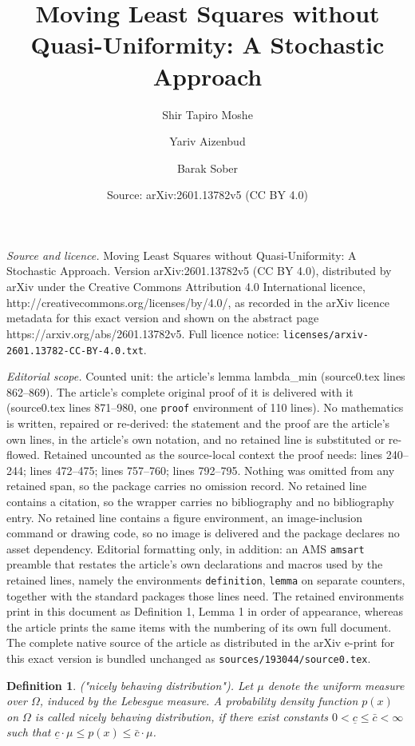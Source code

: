 \documentclass[10pt,a4paper]{amsart}
\title{Moving Least Squares without Quasi-Uniformity: A Stochastic Approach}
\author{Shir Tapiro Moshe \and Yariv Aizenbud \and Barak Sober}
\date{Source: arXiv:2601.13782v5 (CC BY 4.0)}
\newtheorem{definition}{Definition}
\begin{document}
\maketitle

\noindent\emph{Source and licence.} Moving Least Squares without Quasi-Uniformity: A Stochastic Approach. Version arXiv:2601.13782v5 (CC BY 4.0), distributed by arXiv under the Creative Commons Attribution 4.0 International licence, http://creativecommons.org/licenses/by/4.0/, as recorded in the arXiv licence metadata for this exact version and shown on the abstract page https://arxiv.org/abs/2601.13782v5. Full licence notice: \texttt{licenses/arxiv-2601.13782-CC-BY-4.0.txt}.\par\smallskip

\noindent\textit{Editorial scope.} Counted unit: the article's lemma lambda\_min (source0.tex lines 862--869). The article's complete original proof of it is delivered with it (source0.tex lines 871--980, one \texttt{proof} environment of 110 lines). No mathematics is written, repaired or re-derived: the statement and the proof are the article's own lines, in the article's own notation, and no retained line is substituted or re-flowed.  Retained uncounted as the source-local context the proof needs: lines 240--244; lines 472--475; lines 757--760; lines 792--795.  Nothing was omitted from any retained span, so the package carries no omission record.  No retained line contains a citation, so the wrapper carries no bibliography and no bibliography entry.  No retained line contains a figure environment, an image-inclusion command or drawing code, so no image is delivered and the package declares no asset dependency.  Editorial formatting only, in addition: an AMS \texttt{amsart} preamble that restates the article's own declarations and macros used by the retained lines, namely the environments \texttt{definition}, \texttt{lemma} on separate counters, together with the standard packages those lines need.  The retained environments print in this document as Definition 1, Lemma 1 in order of appearance, whereas the article prints the same items with the numbering of its own full document.  The complete native source of the article as distributed in the arXiv e-print for this exact version is bundled unchanged as \texttt{sources/193044/source0.tex}.
\begin{definition} ("nicely behaving distribution").
    Let $\mu$ denote the uniform measure over $\Omega$, induced by the Lebesgue measure.
A probability density function $p(x)$ on $\Omega$ is called nicely behaving distribution, if there exist constants $0<\underline{c} \leq \bar{c}<\infty$ such that $\underline{c} \cdot \mu \leq p(x) \leq \bar{c} \cdot \mu$.
    \label{NicelyDef}
\end{definition}
\end{document}

